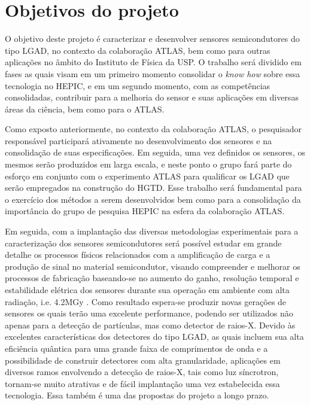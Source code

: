 \chapter{Objetivos do projeto}

O objetivo deste projeto é caracterizar e desenvolver sensores semicondutores do tipo LGAD, no contexto da colaboração ATLAS, bem como para outras aplicações no âmbito do Instituto de Física da USP. O trabalho será dividido em fases as quais visam em um primeiro momento consolidar o {\it know how} sobre essa tecnologia no HEPIC, e em um segundo momento, com as competências consolidadas, contribuir para a melhoria do sensor e suas aplicações em diversas áreas da ciência, bem como para o ATLAS.

Como exposto anteriormente, no contexto da colaboração ATLAS, o pesquisador responsável participará ativamente no desenvolvimento dos sensores e na consolidação de suas especificações. Em seguida, uma vez definidos os sensores, os mesmos serão produzidos em larga escala, e neste ponto o grupo fará parte do esforço em conjunto com o experimento ATLAS para qualificar os LGAD que serão empregados na construção do HGTD. Esse trabalho será fundamental para o exercício dos métodos a serem desenvolvidos bem como para a consolidação da importância do grupo de pesquisa HEPIC na esfera da colaboração ATLAS.

Em seguida, com a implantação das diversas metodologias experimentais para a caracterização dos sensores semicondutores será possível estudar em grande detalhe os processos físicos relacionados com a amplificação de carga e a produção de sinal no material semicondutor, visando compreender e melhorar os processos de fabricação baseando-se no aumento do ganho, resolução temporal e estabilidade elétrica dos sensores durante sua operação em ambiente com alta radiação, i.e. 4.2MGy \cite{tdr}. 
Como resultado espera-se produzir novas gerações de sensores os quais terão uma excelente performance, podendo ser utilizados não apenas para a detecção de partículas, mas como detector de raios-X. Devido às excelentes características dos detectores do tipo LGAD, as quais incluem sua alta eficiência quântica para uma grande faixa de comprimentos de onda e a possibilidade de construir detectores com alta granularidade, aplicações em diversos ramos envolvendo a detecção de raios-X, tais como luz síncrotron, tornam-se muito atrativas e de fácil implantação uma vez estabelecida essa tecnologia. Essa também é uma das propostas do projeto a longo prazo.

